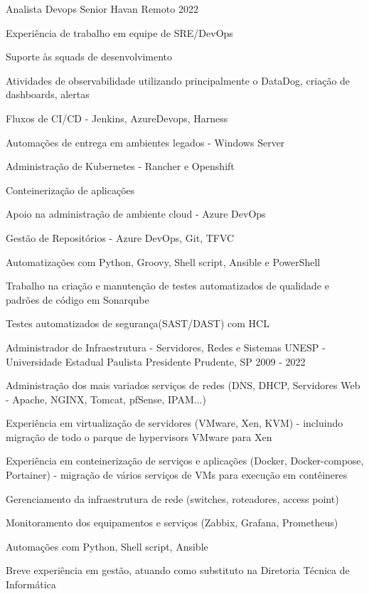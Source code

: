 \begin{cventries}
  \cventry
    {Analista Devops Senior} %
    {Havan} %
    {Remoto} %
    {2022} %
    {
      \begin{cvitems} %
        \item {Experiência de trabalho em equipe de SRE/DevOps}
        \item {Suporte às squads de desenvolvimento}
        \item {Atividades de observabilidade utilizando principalmente o DataDog, criação de dashboards, alertas}
        \item {Fluxos de CI/CD - Jenkins, AzureDevops, Harness}
        \item {Automações de entrega em ambientes legados - Windows Server}
        \item {Administração de Kubernetes - Rancher e Openshift}
        \item {Conteinerização de aplicações}
        \item {Apoio na administração de ambiente cloud - Azure DevOps}
        \item {Gestão de Repositórios - Azure DevOps, Git, TFVC}
        \item {Automatizações com Python, Groovy, Shell script, Ansible e PowerShell}
        \item {Trabalho na criação e manutenção de testes automatizados de qualidade e padrões de código em Sonarqube}
        \item {Testes automatizados de segurança(SAST/DAST) com HCL}
      \end{cvitems}
    }

  \cventry
    {Administrador de Infraestrutura - Servidores, Redes e Sistemas} %
    {UNESP - Universidade Estadual Paulista} %
    {Presidente Prudente, SP} %
    {2009 - 2022} %
    {
      \begin{cvitems} %
        \item {Administração dos mais variados serviços de redes (DNS, DHCP, Servidores Web - Apache, NGINX, Tomcat, pfSense, IPAM...)}
        \item {Experiência em virtualização de servidores (VMware, Xen, KVM) - incluindo migração de todo o parque de hypervisors VMware para Xen}
        \item {Experiência em conteinerização de serviços e aplicações (Docker, Docker-compose, Portainer) - migração de vários serviços de VMs para execução em contêineres}
        \item {Gerenciamento da infraestrutura de rede (switches, roteadores, access point)}
        \item {Monitoramento dos equipamentos e serviços (Zabbix, Grafana, Prometheus)}
        \item {Automações com Python, Shell script, Ansible}
        \item {Breve experiência em gestão, atuando como substituto na Diretoria Técnica de Informática}
      \end{cvitems}
    }


\end{cventries}
